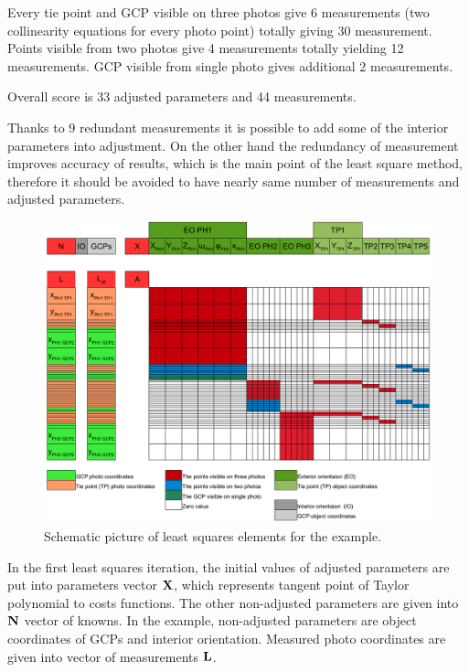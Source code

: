 \documentclass[a4paper,12pt]{article}
\newcommand{\evect}[1]{
{\bf #1}
}
\begin{document}
Every tie point and GCP visible on three photos give 6 measurements (two collinearity equations for every photo point)
totally giving 30 measurement.
Points visible from two photos give 4 measurements totally yielding 12 measurements.
GCP visible from single photo gives additional 2 measurements.

Overall score is 33 adjusted parameters and 44 measurements.

Thanks to 9 redundant measurements it is possible to add some of the interior parameters into adjustment.  
On the other hand the redundancy of measurement improves accuracy of results, which is the main point of the least square method,
therefore it should be avoided to have nearly same number of measurements and adjusted parameters.


\begin{figure}[h]
    \hspace*{-1.0in}
   \includegraphics[scale=0.47]{figures/bba_system.png}
    \caption{Schematic picture of least squares elements for the example.}
    \label{fig:bba_system}
\end{figure}



In the first least squares iteration, the initial values of adjusted parameters are put into parameters vector $\evect{X}$,
which represents tangent point of Taylor polynomial to costs functions.  The other non-adjusted 
parameters are given into $\evect{N}$ vector of knowns. In the example, non-adjusted parameters are object coordinates
of GCPs and interior orientation. 
Measured photo coordinates are given
into vector of measurements $\evect{L}$.
\end{document}
